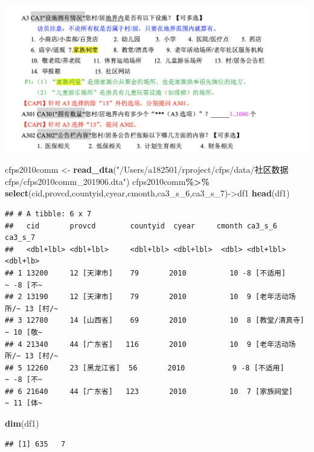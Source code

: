 \documentclass[
]{book}
\newenvironment{Shaded}{\begin{snugshade}}{\end{snugshade}}
\newcommand{\FunctionTok}[1]{\textcolor[rgb]{0.13,0.29,0.53}{\textbf{#1}}}
\newcommand{\NormalTok}[1]{#1}
\newcommand{\OtherTok}[1]{\textcolor[rgb]{0.56,0.35,0.01}{#1}}
\newcommand{\SpecialCharTok}[1]{\textcolor[rgb]{0.81,0.36,0.00}{\textbf{#1}}}
\newcommand{\StringTok}[1]{\textcolor[rgb]{0.31,0.60,0.02}{#1}}
\begin{document}
\includegraphics{image/q1.png}

\begin{Shaded}
\begin{Highlighting}[]
\NormalTok{cfps2010comm }\OtherTok{\textless{}{-}} \FunctionTok{read\_dta}\NormalTok{(}\StringTok{"/Users/a182501/rproject/cfps/data/社区数据cfps/cfps2010comm\_201906.dta"}\NormalTok{)}
\NormalTok{cfps2010comm}\SpecialCharTok{\%\textgreater{}\%}
  \FunctionTok{select}\NormalTok{(cid,provcd,countyid,cyear,cmonth,ca3\_s\_6,ca3\_s\_7)}\OtherTok{{-}\textgreater{}}\NormalTok{df1}
\FunctionTok{head}\NormalTok{(df1)}
\end{Highlighting}
\end{Shaded}

\begin{verbatim}
## # A tibble: 6 x 7
##   cid       provcd        countyid  cyear     cmonth ca3_s_6            ca3_s_7 
##   <dbl+lbl> <dbl+lbl>     <dbl+lbl> <dbl+lbl>  <dbl> <dbl+lbl>          <dbl+lb>
## 1 13200     12 [天津市]    79       2010          10 -8 [不适用]      ~ -8 [不~
## 2 13190     12 [天津市]    79       2010          10  9 [老年活动场所/~ 13 [村/~
## 3 12780     14 [山西省]    69       2010          10  8 [教堂/清真寺] ~ 10 [敬~
## 4 21340     44 [广东省]   116       2010          10  9 [老年活动场所/~ 13 [村/~
## 5 12260     23 [黑龙江省]  56       2010           9 -8 [不适用]      ~ -8 [不~
## 6 21640     44 [广东省]   123       2010          10  7 [家族祠堂]    ~ 11 [体~
\end{verbatim}

\begin{Shaded}
\begin{Highlighting}[]
\FunctionTok{dim}\NormalTok{(df1)}
\end{Highlighting}
\end{Shaded}

\begin{verbatim}
## [1] 635   7
\end{verbatim}
\end{document}
